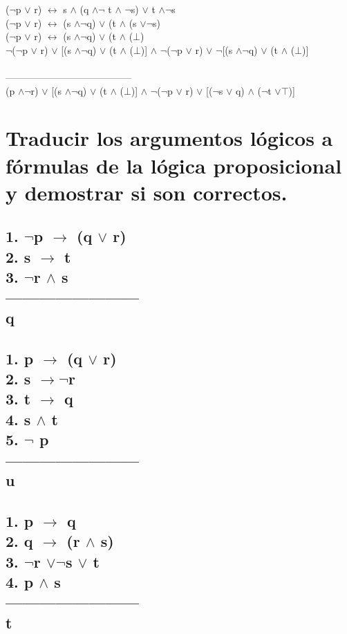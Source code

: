 \documentclass[11pt,letterpaper]{article}
\begin{document}
        \qquad ($\neg$p $\vee$ r) $\leftrightarrow$ s $\wedge$ (q $\wedge \neg$ t $\wedge$ $\neg$s) $\vee$ t $\wedge \neg$s \\
        \qquad ($\neg$p $\vee$ r) $\leftrightarrow$ (s $\wedge \neg$q) $\vee$ (t $\wedge$ (s $\vee \neg$s) \\
        \qquad ($\neg$p $\vee$ r) $\leftrightarrow$ (s $\wedge \neg$q) $\vee$ (t $\wedge$ ($\bot$) \\
        \qquad $\neg$($\neg$p $\vee$ r) $\vee$ [(s $\wedge \neg$q) $\vee$ (t $\wedge$ ($\bot$)] $\wedge$  $\neg$($\neg$p $\vee$ r) $\vee$ $\neg$[(s $\wedge \neg$q) $\vee$ (t $\wedge$ ($\bot$)]\\ \\
        --------------------------------------- \\
        \qquad (p $\wedge \neg$r) $\vee$ [(s $\wedge \neg$q) $\vee$ (t $\wedge$ ($\bot$)] $\wedge$  $\neg$($\neg$p $\vee$ r) $\vee$ [($\neg$s $\vee$ q) $\wedge$ ($\neg$t $\vee \top$)] \\
  \section{Traducir los argumentos lógicos a fórmulas de la lógica proposicional y demostrar si son correctos.}
  \begin{multicols}{3}

    \subsection{1. $\neg$p $\rightarrow$ (q $\vee$ r)\\
    2. s $\rightarrow$ t \\
    3. $\neg$r $\wedge$ s \\
    ------------------------ \\
    q}
    \subsection{1. p $\rightarrow$ (q $\vee$ r) \\
    2. s $\rightarrow \neg$r \\
    3. t $\rightarrow$ q \\
    4. s $\wedge$ t \\
    5. $\neg$ p \\
    ------------------------ \\
     u  }
    \subsection{1. p $\rightarrow$ q \\
    2. q $\rightarrow$ (r $\wedge$ s) \\
    3. $\neg$r $\vee \neg$s $\vee$ t \\
    4. p $\wedge$ s \\
    ------------------------ \\
     t}
   \end{multicols}
\end{document}
